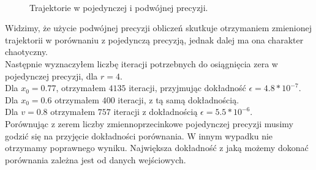\documentclass{article}
\begin{document}
        \begin{figure}[h!]
            \centering        
            \\
            \caption{Trajektorie w pojedynczej i podwójnej precyzji.}
        \end{figure}      
        \FloatBarrier
        Widzimy, że użycie podwójnej precyzji obliczeń skutkuje otrzymaniem zmienionej trajektorii w porównaniu z pojedynczą precyzją, jednak dalej ma ona charakter chaotyczny.\\ 
        
        Następnie wyznaczyłem liczbę iteracji potrzebnych do osiągnięcia zera w pojedynczej precyzji, dla $r = 4$.\\
        Dla $x_0=0.77$, otrzymałem $4135$ iteracji, przyjmując dokładność $\epsilon = 4.8*10^{-7}$.\\ Dla $x_0=0.6$ otrzymałem $400$ iteracji, z tą samą dokładnością.\\ Dla $v=0.8$ otrzymałem $757$ iteracji z dokładnością $\epsilon = 5.5*10^{-6}$.\\ Porównując z zerem liczby zmiennoprzecinkowe pojedynczej precyzji musimy godzić się na przyjęcie dokładności porównania. W innym wypadku nie otrzymamy poprawnego wyniku. Największa dokładność z jaką możemy dokonać porównania zależna jest od danych wejściowych. 
\end{document}
